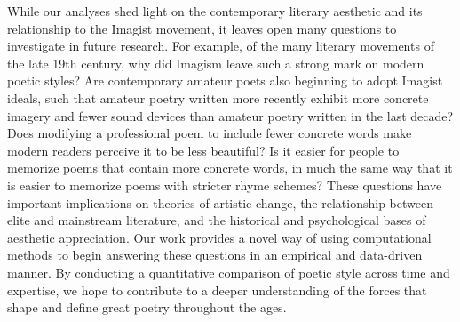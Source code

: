 \documentclass{book}
\begin{document}
While our analyses shed light on the contemporary literary aesthetic and its relationship to the Imagist movement, it leaves open many questions to investigate in future research. For example, of the many literary movements of the late 19th century, why did Imagism leave such a strong mark on modern poetic styles? Are contemporary amateur poets also beginning to adopt Imagist ideals, such that amateur poetry written more recently exhibit more concrete imagery and fewer sound devices than amateur poetry written in the last decade? Does modifying a professional poem to include fewer concrete words make modern readers perceive it to be less beautiful? Is it easier for people to memorize poems that contain more concrete words, in much the same way that it is easier to memorize poems with stricter rhyme schemes? These questions have important implications on theories of artistic change, the relationship between elite and mainstream literature, and the historical and psychological bases of aesthetic appreciation. Our work provides a novel way of using computational methods to begin answering these questions in an empirical and data-driven manner. By conducting a quantitative comparison of poetic style across time and expertise, we hope to contribute to a deeper understanding of the forces that shape and define great poetry throughout the ages.
\end{document}
